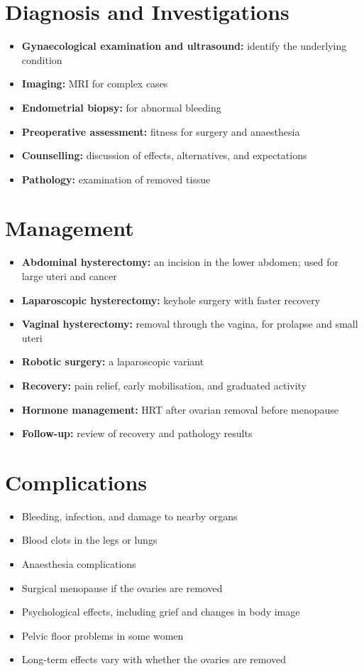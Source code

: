 \section*{Diagnosis and Investigations}
\begin{itemize}
    \item \textbf{Gynaecological examination and ultrasound:} identify the underlying condition
    \item \textbf{Imaging:} MRI for complex cases
    \item \textbf{Endometrial biopsy:} for abnormal bleeding
    \item \textbf{Preoperative assessment:} fitness for surgery and anaesthesia
    \item \textbf{Counselling:} discussion of effects, alternatives, and expectations
    \item \textbf{Pathology:} examination of removed tissue
\end{itemize}

\section*{Management}
\begin{itemize}
    \item \textbf{Abdominal hysterectomy:} an incision in the lower abdomen; used for large uteri and cancer
    \item \textbf{Laparoscopic hysterectomy:} keyhole surgery with faster recovery
    \item \textbf{Vaginal hysterectomy:} removal through the vagina, for prolapse and small uteri
    \item \textbf{Robotic surgery:} a laparoscopic variant
    \item \textbf{Recovery:} pain relief, early mobilisation, and graduated activity
    \item \textbf{Hormone management:} HRT after ovarian removal before menopause
    \item \textbf{Follow-up:} review of recovery and pathology results
\end{itemize}

\section*{Complications}
\begin{itemize}
    \item Bleeding, infection, and damage to nearby organs
    \item Blood clots in the legs or lungs
    \item Anaesthesia complications
    \item Surgical menopause if the ovaries are removed
    \item Psychological effects, including grief and changes in body image
    \item Pelvic floor problems in some women
    \item Long-term effects vary with whether the ovaries are removed
\end{itemize}

